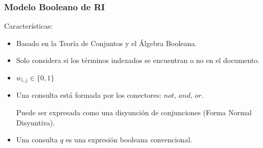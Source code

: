 \documentclass[
10pt, %
aspectratio=169, %
]{beamer}
\begin{document}
	\begin{frame}
		
		\frametitle{Modelo Booleano de RI}
		
		Características:
		\begin{itemize}
			\item Basado en la Teoría de Conjuntos y el Álgebra Booleana. \\[2mm]
			
			\item Solo considera si los términos indexados se encuentran o no en el documento. \\[2mm]
			
			\item $w_{i, j} \in \{0, 1\}$ \\[2mm]
			
			\item Una consulta está formada por los conectores: $not$, $and$, $or$. 
			
			Puede ser expresada como una disyunción de conjunciones (Forma Normal Disyuntiva). \\[2mm]
			
			
			\item Una consulta $q$ es una expresión booleana convencional. \\[2mm]
			
		\end{itemize}
		
	\end{frame}
	
\end{document}
